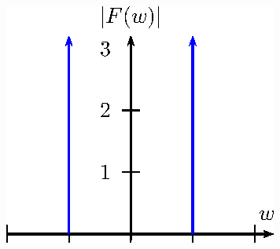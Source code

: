\documentclass[a4paper,10pt]{book}
\begin{document}
\begin{figure}[!ht]
\begin{center}
  \includegraphics{figs/cap_propriedades_transformada_figura_7}
\end{center}
 \caption{\label{diag_espec_05}}
 \end{figure}
 
% 
% 
\end{document}
